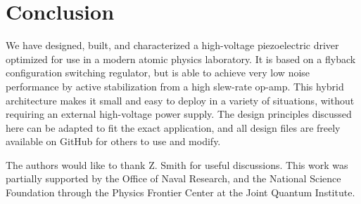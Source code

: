 \documentclass[aip,rsi,reprint]{revtex4-1} %
\begin{document}
\section{Conclusion}
\label{Sec:Conclusion}

We have designed, built, and characterized a high-voltage piezoelectric driver optimized for use in a modern atomic physics laboratory.
It is based on a flyback configuration switching regulator, but is able to achieve very low noise performance by active stabilization from a high slew-rate op-amp.
This hybrid architecture makes it small and easy to deploy in a variety of situations, without requiring an external high-voltage power supply.
The design principles discussed here can be adapted to fit the exact application, and all design files are freely available on GitHub for others to use and modify.

The authors would like to thank Z. Smith for useful discussions.
This work was partially supported by the Office of Naval Research, and the National Science Foundation through the Physics Frontier Center at the Joint Quantum Institute.
 
%
\end{document}
